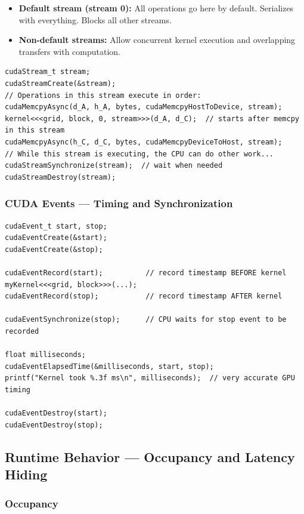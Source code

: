 \documentclass[11pt,a4paper]{article}
\newcommand{\term}[1]{\textbf{\color{darkblue}#1}}
\begin{document}
\begin{itemize}[noitemsep]
  \item \term{Default stream (stream 0):} All operations go here by default. Serializes with everything. Blocks all other streams.
  \item \term{Non-default streams:} Allow concurrent kernel execution and overlapping transfers with computation.
\end{itemize}

\begin{lstlisting}
cudaStream_t stream;
cudaStreamCreate(&stream);
// Operations in this stream execute in order:
cudaMemcpyAsync(d_A, h_A, bytes, cudaMemcpyHostToDevice, stream);
kernel<<<grid, block, 0, stream>>>(d_A, d_C);  // starts after memcpy in this stream
cudaMemcpyAsync(h_C, d_C, bytes, cudaMemcpyDeviceToHost, stream);
// While this stream is executing, the CPU can do other work...
cudaStreamSynchronize(stream);  // wait when needed
cudaStreamDestroy(stream);
\end{lstlisting}

\subsubsection{CUDA Events --- Timing and Synchronization}

\begin{lstlisting}
cudaEvent_t start, stop;
cudaEventCreate(&start);
cudaEventCreate(&stop);

cudaEventRecord(start);          // record timestamp BEFORE kernel
myKernel<<<grid, block>>>(...);
cudaEventRecord(stop);           // record timestamp AFTER kernel

cudaEventSynchronize(stop);      // CPU waits for stop event to be recorded

float milliseconds;
cudaEventElapsedTime(&milliseconds, start, stop);
printf("Kernel took %.3f ms\n", milliseconds);  // very accurate GPU timing

cudaEventDestroy(start);
cudaEventDestroy(stop);
\end{lstlisting}

\subsection{Runtime Behavior --- Occupancy and Latency Hiding}

\subsubsection{Occupancy}
\end{document}
